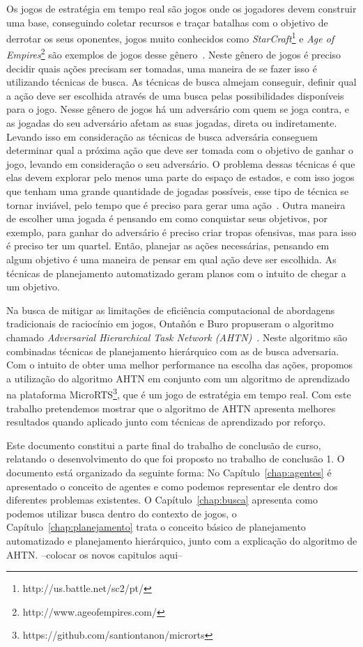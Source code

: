 Os jogos de estratégia em tempo real são jogos onde os jogadores devem construir uma base, conseguindo coletar recursos e traçar batalhas com o objetivo de derrotar os seus oponentes, jogos muito conhecidos como \textit{StarCraft}\footnote{http://us.battle.net/sc2/pt/} e \textit{Age of Empires}\footnote{http://www.ageofempires.com/} são exemplos de jogos desse gênero~\cite{ontanon2013survey}.
Neste gênero de jogos é preciso decidir quais ações precisam ser tomadas, uma maneira de se fazer isso é utilizando técnicas de busca. As técnicas de busca almejam conseguir, definir qual a ação deve ser escolhida através de uma busca pelas possibilidades disponíveis para o jogo. 
Nesse gênero de jogos há um adversário com quem se joga contra, e as jogadas do seu adversário afetam as suas jogadas, direta ou indiretamente. Levando isso em consideração as técnicas de busca adversária conseguem determinar qual a próxima ação que deve ser tomada com o objetivo de ganhar o jogo, levando em consideração o seu adversário. O problema dessas técnicas é que elas devem explorar pelo menos uma parte do espaço de estados, e com isso jogos que tenham uma grande quantidade de jogadas possíveis, esse tipo de técnica se tornar inviável, pelo tempo que é preciso para gerar uma ação~\cite{ontanon2012experiments}.
Outra maneira de escolher uma jogada é pensando em como conquistar seus objetivos, por exemplo, para ganhar do adversário é preciso criar tropas ofensivas, mas para isso é preciso ter um quartel. Então, planejar as ações necessárias, pensando em algum objetivo é uma maneira de pensar em qual ação deve ser escolhida. As técnicas de planejamento automatizado geram planos com o intuito de chegar a um objetivo. 

Na busca de mitigar as limitações de eficiência computacional de abordagens tradicionais de raciocínio em jogos, Ontañón e Buro propuseram o algoritmo chamado \textit{Adversarial Hierarchical Task Network (AHTN)}~\cite{ontanon2015adversarial}. 
Neste algoritmo são combinadas técnicas de planejamento hierárquico com as de busca adversaria. 
Com o intuito de obter uma melhor performance na escolha das ações, propomos a utilização do algoritmo AHTN em conjunto com um algoritmo de aprendizado na plataforma MicroRTS\footnote{https://github.com/santiontanon/microrts}, que é um jogo de estratégia em tempo real. 
Com este trabalho pretendemos mostrar que o algoritmo de AHTN apresenta melhores resultados quando aplicado junto com técnicas de aprendizado por reforço. 

Este documento constitui a parte final do trabalho de conclusão de curso, relatando o desenvolvimento do que foi proposto no trabalho de conclusão 1. O documento está organizado da seguinte forma: No Capítulo~\ref{chap:agentes} é apresentado o conceito de agentes e como podemos representar ele dentro dos diferentes problemas existentes. O Capítulo~\ref{chap:busca} apresenta como podemos utilizar busca dentro do contexto de jogos, o Capítulo~\ref{chap:planejamento} trata o conceito básico de planejamento automatizado e planejamento hierárquico, junto com a explicação do algoritmo de AHTN.  --colocar os novos capitulos aqui--
